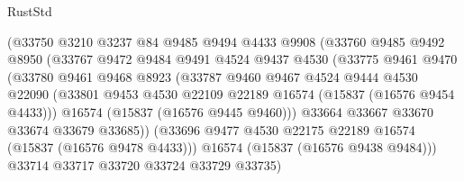 \begin{lexlean}{RustStd}
\begin{coremodule}
{\begin{coremodule}
{{{{{{{{{{{{{{{{{{{{{{{{{{{{{{{{{{{{{{{{{{{{{{{{{{{{{{{{{{{{                          (@33750
                            @3210
                            @3237
                            @84
                            @9485
                            @9494
                            @4433
                            @9908
                            (@33760
                              @9485
                              @9492
                              @8950
                              (@33767
                                @9472
                                @9484
                                @9491
                                @4524
                                @9437
                                @4530
                                (@33775
                                  @9461
                                  @9470
                                  (@33780
                                    @9461
                                    @9468
                                    @8923
                                    (@33787
                                      @9460
                                      @9467
                                      @4524
                                      @9444
                                      @4530
                                      @22090
                                      (@33801
                                        @9453
                                        @4530
                                        @22109
                                        @22189
                                        @16574
                                        (@15837 (@16576 @9454 @4433)))
                                      @16574
                                      (@15837 (@16576 @9445 @9460)))
                                    @33664
                                    @33667
                                    @33670
                                    @33674
                                    @33679
                                    @33685))
                                (@33696
                                  @9477
                                  @4530
                                  @22175
                                  @22189
                                  @16574
                                  (@15837 (@16576 @9478 @4433)))
                                @16574
                                (@15837 (@16576 @9438 @9484)))
                              @33714
                              @33717
                              @33720
                              @33724
                              @33729
                              @33735)
}}}}}}}}}}}}}}}}}}}}}}}}}}}}}}}}}}}}}}}}}}}}}}}}}}}}}}}}}}}}
\end{coremodule}}
\end{coremodule}
\end{lexlean}
